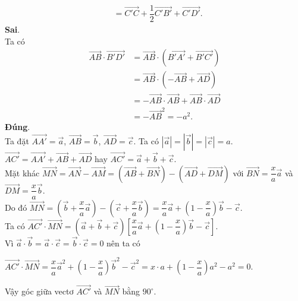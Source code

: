 \begin{ex}
{\begin{itemchoice}
\begin{align*}
&=\overrightarrow{C'C}+\dfrac{1}{2}\overrightarrow{C'B'}+\overrightarrow{C'D'}.
\end{align*}
\itemch \textbf{Sai}.\\
Ta có
\begin{align*}
\overrightarrow{AB}\cdot\overrightarrow{B'D'}&=\overrightarrow{AB}\cdot\left(\overrightarrow{B'A'}+\overrightarrow{B'C'}\right)\\
&=\overrightarrow{AB}\cdot\left(-\overrightarrow{AB}+\overrightarrow{AD}\right)\\
&=-\overrightarrow{AB}\cdot\overrightarrow{AB}+\overrightarrow{AB}\cdot\overrightarrow{AD}\\
&=-{\overrightarrow{AB}}^2=-a^2.
\end{align*}
\itemch \textbf{Đúng}.\\
Ta đặt $\overrightarrow{AA'}=\overrightarrow{a}$, $\overrightarrow{AB}=\overrightarrow{b}$, $\overrightarrow{AD}=\overrightarrow{c}$. Ta có $\left\vert\overrightarrow{a}\right\vert=\left\vert\overrightarrow{b}\right\vert=\left\vert\overrightarrow{c}\right\vert=a$.\\
$\overrightarrow{AC'}=\overrightarrow{AA'}+\overrightarrow{AB}+\overrightarrow{AD}$ hay $\overrightarrow{AC'}=\overrightarrow{a}+\overrightarrow{b}+\overrightarrow{c}$.\\
Mặt khác $\overrightarrow{MN}=\overrightarrow{AN}-\overrightarrow{AM}=\left(\overrightarrow{AB}+\overrightarrow{BN}\right)-\left(\overrightarrow{AD}+\overrightarrow{DM}\right)$ với $\overrightarrow{BN}=\dfrac{x}{a}\overrightarrow{a}$ và $\overrightarrow{DM}=\dfrac{x}{a}\overrightarrow{b}$.\\
Do đó $\overrightarrow{MN}=\left(\overrightarrow{b}+\dfrac{x}{a}\overrightarrow{a}\right)-\left(\overrightarrow{c}+\dfrac{x}{a}\overrightarrow{b}\right)=\dfrac{x}{a}\overrightarrow{a}+\left(1-\dfrac{x}{a}\right)\overrightarrow{b}-\overrightarrow{c}$.\\
Ta có $\overrightarrow{AC'}\cdot\overrightarrow{MN}=\left(\overrightarrow{a}+\overrightarrow{b}+\overrightarrow{c}\right)\left[\dfrac{x}{a}\overrightarrow{a}+\left(1-\dfrac{x}{a}\right)\overrightarrow{b}-\overrightarrow{c}\right]$.\\
Vì $\overrightarrow{a}\cdot\overrightarrow{b}=\overrightarrow{a}\cdot\overrightarrow{c}=\overrightarrow{b}\cdot\overrightarrow{c}=0$ nên ta có
\begin{center}
$\overrightarrow{AC'}\cdot\overrightarrow{MN}=\dfrac{x}{a}{\overrightarrow{a}}^2+\left(1-\dfrac{x}{a}\right){\overrightarrow{b}}^2-{\overrightarrow{c}}^2=x\cdot a+\left(1-\dfrac{x}{a}\right)a^2-a^2=0$.
\end{center}
Vậy góc giữa vectơ $\overrightarrow{AC'}$ và $\overrightarrow{MN}$ bằng $90^\circ$.
\end{itemchoice}
}
\end{ex}

